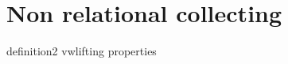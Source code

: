 \section{Non relational collecting}
\label{sec:nonrelational}


{definition2}
{vwlifting}
{properties}
